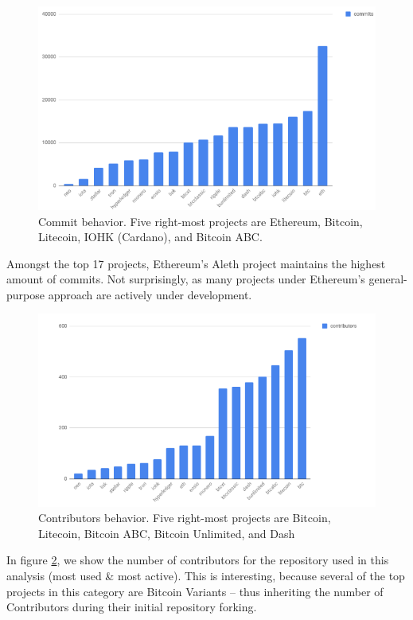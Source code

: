 \documentclass[12pt, titlepage, twocolumn]{report}
\begin{document}
\begin{figure}[ht]
\centering
	\includegraphics[width=\textwidth]{commits}
	\caption{Commit behavior. Five right-most projects are Ethereum, Bitcoin, Litecoin, IOHK (Cardano), and Bitcoin ABC.}
	\label{commits}
\end{figure}

Amongst the top 17 projects, Ethereum's Aleth project maintains the highest amount of commits. Not surprisingly, as many projects under Ethereum's general-purpose approach are actively under development.


\begin{figure}[ht]
\centering
	\includegraphics[width=\textwidth]{contributors}
	\caption{Contributors behavior. Five right-most projects are Bitcoin, Litecoin, Bitcoin ABC, Bitcoin Unlimited, and Dash}
	\label{contributors}
\end{figure}

In figure \ref{contributors}, we show the number of contributors for the repository used in this analysis (most used \& most active). This is interesting, because several of the top projects in this category are Bitcoin Variants -- thus inheriting the number of Contributors during their initial repository forking.
\end{document}
